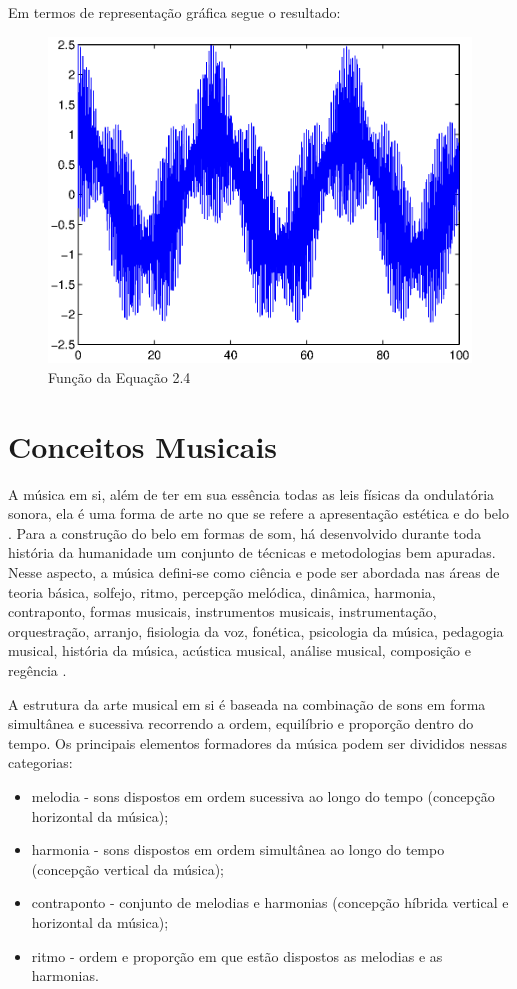 \newpage
Em termos de representação gráfica segue o resultado:
\begin{figure}[h]
	\centering
		\includegraphics[scale=1]{figuras/Amcos.eps}
	\caption{Função da Equação 2.4}
\end{figure}

\section{Conceitos Musicais}
\label{sec:conceitosmusicais}

A música em si, além de ter em sua essência todas as leis físicas da ondulatória sonora, ela é uma forma de arte no que se refere a apresentação estética e do belo \cite{wolfflin2000conceitos}. Para a construção do belo em formas de som, há desenvolvido durante toda história da humanidade um conjunto de técnicas e metodologias bem apuradas. Nesse aspecto, a música defini-se como ciência e pode ser abordada nas áreas de teoria básica, solfejo, ritmo, percepção melódica, dinâmica, harmonia, contraponto, formas musicais, instrumentos musicais, instrumentação, orquestração, arranjo, fisiologia da voz, fonética, psicologia da música, pedagogia musical, história da música, acústica musical, análise musical, composição e regência \cite{med1996teoria}.

A estrutura da arte musical em si é baseada na combinação de sons em forma simultânea e sucessiva recorrendo a ordem, equilíbrio e proporção dentro do tempo. Os principais elementos formadores da música podem ser divididos nessas categorias:
\begin{itemize}
	\item melodia - sons dispostos em ordem sucessiva ao longo do tempo (concepção horizontal da música);
	\item harmonia - sons dispostos em ordem simultânea ao longo do tempo (concepção vertical da música);
	\item contraponto - conjunto de melodias e harmonias (concepção híbrida vertical e horizontal da música);
	\item ritmo - ordem e proporção em que estão dispostos as melodias e as harmonias.
\end{itemize}

